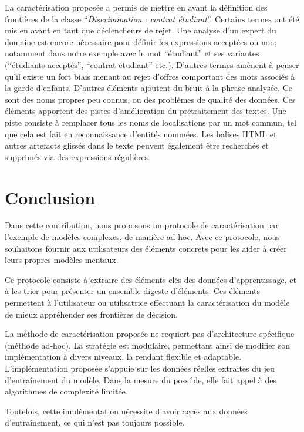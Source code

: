 La caractérisation proposée a permis de mettre en avant la définition des frontières de la classe ``\textit{Discrimination : contrat étudiant}''.
Certains termes ont été mis en avant en tant que déclencheurs de rejet. Une analyse d'un expert du domaine est encore nécessaire pour définir les expressions acceptées ou non; notamment dans notre exemple avec le mot ``étudiant'' et ses variantes (``étudiants acceptés'', ``contrat étudiant'' etc.).
D'autres termes amènent à penser qu'il existe un fort biais menant au rejet d'offres comportant des mots associés à la garde d'enfants.
D'autres éléments ajoutent du bruit à la phrase analysée. Ce sont des noms propres peu connus, ou des problèmes de qualité des données. Ces éléments apportent des pistes d'amélioration du prétraitement des textes. Une piste consiste à remplacer tous les noms de localisations par un mot commun, tel que cela est fait en reconnaissance d'entités nommées. Les balises HTML et autres artefacts glissés dans le texte peuvent également être recherchés et supprimés via des expressions régulières.


\section{Conclusion}

Dans cette contribution, nous proposons un protocole de caractérisation par l'exemple de modèles complexes, de manière ad-hoc.  Avec ce protocole, nous souhaitons fournir aux utilisateurs des éléments concrets pour les aider à créer leurs propres modèles mentaux.

Ce protocole consiste à extraire des éléments clés des données d'apprentissage, et à les trier pour présenter un ensemble digeste d'éléments. Ces éléments permettent à l'utilisateur ou utilisatrice effectuant la caractérisation du modèle de mieux appréhender ses frontières de décision.

La méthode de caractérisation proposée ne requiert pas d'architecture spécifique (méthode ad-hoc).
La stratégie est modulaire, permettant ainsi de modifier son implémentation à divers niveaux, la rendant flexible et adaptable.
L'implémentation proposée s'appuie sur les données réelles extraites du jeu d'entraînement du modèle. Dans la mesure du possible, elle fait appel à des algorithmes de complexité limitée.

Toutefois, cette implémentation nécessite d'avoir accès aux données d'entraînement, ce qui n'est pas toujours possible.

